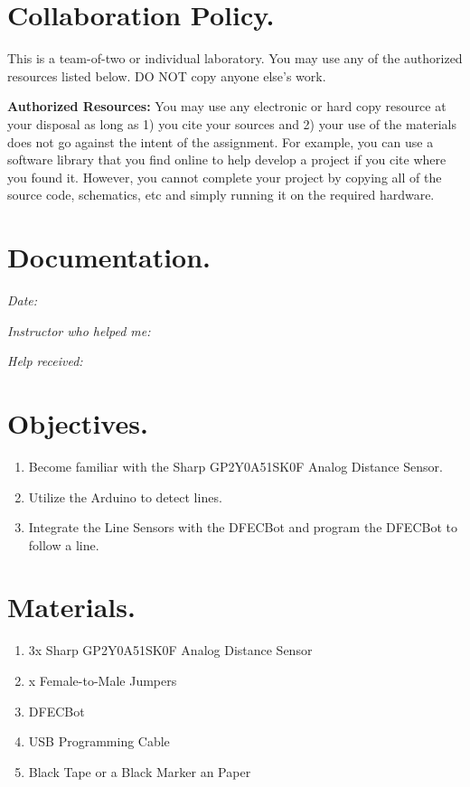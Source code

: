 \documentclass{handout}
\begin{document}
	\maketitle
	
	\section{Collaboration Policy.}
	This is a team-of-two or individual laboratory. You may use any of the authorized resources listed below. DO NOT copy anyone else’s work.
	
	\textbf{Authorized Resources:} You may use any electronic or hard copy resource at your disposal as long as 1) you cite your sources and 2) your use of the materials does not go against the intent of the assignment. For example, you can use a software library that you find online to help develop a project if you cite where you found it. However, you cannot complete your project by copying all of the source code, schematics, etc and simply running it on the required hardware.
	
	\section{Documentation.}
	\textit{Date:}
	
	\textit{Instructor who helped me:}
	
	\textit{Help received:}
	
	\section{Objectives.} 
	\begin{enumerate}
		\item Become familiar with the Sharp GP2Y0A51SK0F Analog Distance Sensor.
		\item Utilize the Arduino to detect lines.
		\item Integrate the Line Sensors with the DFECBot and program the DFECBot to follow a line.
	\end{enumerate}
	
	\section{Materials.}
	\begin{enumerate}
		\item 3x Sharp GP2Y0A51SK0F Analog Distance Sensor
		\item x Female-to-Male Jumpers
		\item DFECBot
		\item USB Programming Cable
		\item Black Tape or a Black Marker an Paper
	\end{enumerate}
	
\end{document}
